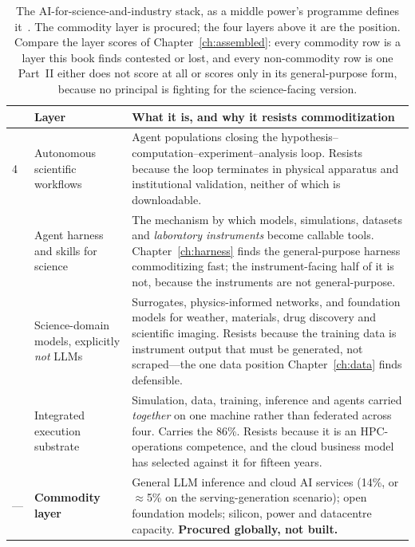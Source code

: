 \begin{table}[htbp]
  \centering\footnotesize
  \caption{The AI-for-science-and-industry stack, as a middle power's programme defines it~\cite{ai4si-stack}. The commodity layer is procured; the four layers above it are the position. Compare the layer scores of Chapter~\ref{ch:assembled}: every commodity row is a layer this book finds contested or lost, and every non-commodity row is one Part~II either does not score at all or scores only in its general-purpose form, because no principal is fighting for the science-facing version.}
  \label{tab:ai4si}
  \begin{tabular}{@{}p{6mm}p{40mm}p{92mm}@{}}
    \toprule
    & \textbf{Layer} & \textbf{What it is, and why it resists commoditization} \\
    \midrule
    4 & Autonomous scientific workflows & Agent populations closing the hypothesis--computation--experiment--analysis loop. Resists because the loop terminates in physical apparatus and institutional validation, neither of which is downloadable. \\
    \addlinespace
    3 & Agent harness and skills for science & The mechanism by which models, simulations, datasets and \emph{laboratory instruments} become callable tools. Chapter~\ref{ch:harness} finds the general-purpose harness commoditizing fast; the instrument-facing half of it is not, because the instruments are not general-purpose. \\
    \addlinespace
    2 & Science-domain models, explicitly \emph{not} LLMs & Surrogates, physics-informed networks, and foundation models for weather, materials, drug discovery and scientific imaging. Resists because the training data is instrument output that must be generated, not scraped---the one data position Chapter~\ref{ch:data} finds defensible. \\
    \addlinespace
    1 & Integrated execution substrate & Simulation, data, training, inference and agents carried \emph{together} on one machine rather than federated across four. Carries the 86\%. Resists because it is an HPC-operations competence, and the cloud business model has selected against it for fifteen years. \\
    \midrule
    --- & \textbf{Commodity layer} & General LLM inference and cloud AI services (14\%, or $\approx$5\% on the serving-generation scenario); open foundation models; silicon, power and datacentre capacity. \textbf{Procured globally, not built.} \\
    \bottomrule
  \end{tabular}
\end{table}

